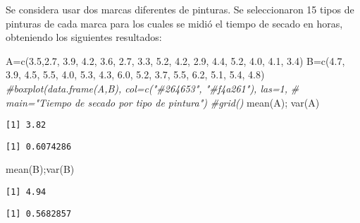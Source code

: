 \documentclass[
]{article}
\newenvironment{Shaded}{\begin{snugshade}}{\end{snugshade}}
\newcommand{\CommentTok}[1]{\textcolor[rgb]{0.56,0.35,0.01}{\textit{#1}}}
\newcommand{\FloatTok}[1]{\textcolor[rgb]{0.00,0.00,0.81}{#1}}
\newcommand{\FunctionTok}[1]{\textcolor[rgb]{0.00,0.00,0.00}{#1}}
\newcommand{\NormalTok}[1]{#1}
\newcommand{\OtherTok}[1]{\textcolor[rgb]{0.56,0.35,0.01}{#1}}
\begin{document}
Se considera usar dos marcas diferentes de pinturas. Se seleccionaron 15
tipos de pinturas de cada marca para los cuales se midió el tiempo de
secado en horas, obteniendo los siguientes resultados:

\begin{Shaded}
\begin{Highlighting}[]
\NormalTok{A}\OtherTok{=}\FunctionTok{c}\NormalTok{(}\FloatTok{3.5}\NormalTok{,}\FloatTok{2.7}\NormalTok{, }\FloatTok{3.9}\NormalTok{, }\FloatTok{4.2}\NormalTok{, }\FloatTok{3.6}\NormalTok{, }\FloatTok{2.7}\NormalTok{, }\FloatTok{3.3}\NormalTok{, }\FloatTok{5.2}\NormalTok{, }\FloatTok{4.2}\NormalTok{, }\FloatTok{2.9}\NormalTok{, }\FloatTok{4.4}\NormalTok{, }\FloatTok{5.2}\NormalTok{, }\FloatTok{4.0}\NormalTok{, }\FloatTok{4.1}\NormalTok{, }\FloatTok{3.4}\NormalTok{)}
\NormalTok{B}\OtherTok{=}\FunctionTok{c}\NormalTok{(}\FloatTok{4.7}\NormalTok{, }\FloatTok{3.9}\NormalTok{, }\FloatTok{4.5}\NormalTok{, }\FloatTok{5.5}\NormalTok{, }\FloatTok{4.0}\NormalTok{, }\FloatTok{5.3}\NormalTok{, }\FloatTok{4.3}\NormalTok{, }\FloatTok{6.0}\NormalTok{, }\FloatTok{5.2}\NormalTok{, }\FloatTok{3.7}\NormalTok{, }\FloatTok{5.5}\NormalTok{, }\FloatTok{6.2}\NormalTok{, }\FloatTok{5.1}\NormalTok{, }\FloatTok{5.4}\NormalTok{, }\FloatTok{4.8}\NormalTok{)}
\CommentTok{\#boxplot(data.frame(A,B), col=c("\#264653", "\#f4a261"), las=1,}
\CommentTok{\#        main="Tiempo de secado por tipo de pintura")}
\CommentTok{\#grid()}
\FunctionTok{mean}\NormalTok{(A); }\FunctionTok{var}\NormalTok{(A)}
\end{Highlighting}
\end{Shaded}

\begin{verbatim}
[1] 3.82
\end{verbatim}

\begin{verbatim}
[1] 0.6074286
\end{verbatim}

\begin{Shaded}
\begin{Highlighting}[]
\FunctionTok{mean}\NormalTok{(B);}\FunctionTok{var}\NormalTok{(B)}
\end{Highlighting}
\end{Shaded}

\begin{verbatim}
[1] 4.94
\end{verbatim}

\begin{verbatim}
[1] 0.5682857
\end{verbatim}
\end{document}
